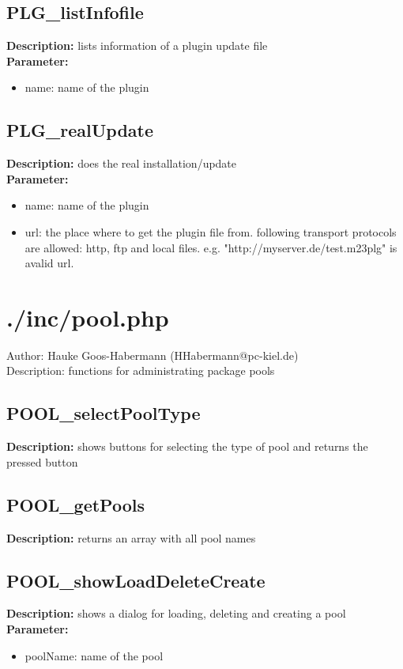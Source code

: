 \subsection{PLG\_listInfofile}
\textbf{Description:} lists information of a plugin update file\\
\textbf{Parameter:}
\begin{itemize}
\item name: name of the plugin
\end{itemize}

\subsection{PLG\_realUpdate}
\textbf{Description:} does the real installation/update\\
\textbf{Parameter:}
\begin{itemize}
\item name: name of the plugin
\item url: the place where to get the plugin file from. following transport protocols are allowed: http, ftp and local files. e.g. "http://myserver.de/test.m23plg" is avalid url.
\end{itemize}

\newpage\section{./inc/pool.php}
 Author: Hauke Goos-Habermann (HHabermann@pc-kiel.de)\\
 Description: functions for administrating package pools\\

\subsection{POOL\_selectPoolType}
\textbf{Description:} shows buttons for selecting the type of pool and returns the pressed button\\

\subsection{POOL\_getPools}
\textbf{Description:} returns an array with all pool names\\

\subsection{POOL\_showLoadDeleteCreate}
\textbf{Description:} shows a dialog for loading, deleting and creating a pool\\
\textbf{Parameter:}
\begin{itemize}
\item poolName: name of the pool
\end{itemize}


